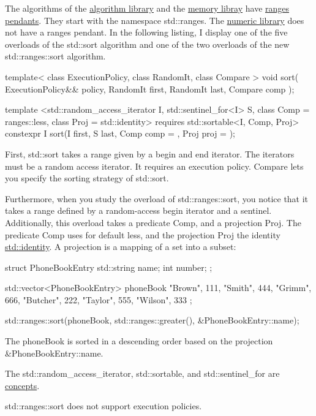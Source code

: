 The algorithms of the \href{https://en.cppreference.com/w/cpp/header/algorithm}{algorithm library} and the \href{https://en.cppreference.com/w/cpp/header/memory}{memory libray} have \href{https://en.cppreference.com/w/cpp/algorithm/ranges}{ranges pendants}. They start with the namespace std::ranges. The \href{https://en.cppreference.com/w/cpp/header/numeric}{numeric library} does not have a ranges pendant. In the following listing, I display one of the five overloads of the std::sort algorithm and one of the two overloads of the new std::ranges::sort algorithm.

\begin{cpp}
template< class ExecutionPolicy, class RandomIt, class Compare >
void sort( ExecutionPolicy&& policy,
		   RandomIt first, RandomIt last, Compare comp );

template <std::random_access_iterator I, std::sentinel_for<I> S,
		class Comp = ranges::less, class Proj = std::identity>
requires std::sortable<I, Comp, Proj>
constexpr I sort(I first, S last, Comp comp = {}, Proj proj = {});
\end{cpp}

First, std::sort takes a range given by a begin and end iterator. The iterators must be a random access iterator. It requires an execution policy. Compare lets you specify the sorting strategy of std::sort.

Furthermore, when you study the overload of std::ranges::sort, you notice that it takes a range defined by a random-access begin iterator and a sentinel. Additionally, this overload takes a predicate Comp, and a projection Proj. The predicate Comp uses for default less, and the projection Proj the identity \href{https://en.cppreference.com/w/cpp/utility/functional/identity}{std::identity}. A projection is a mapping of a set into a subset:

\begin{cpp}
struct PhoneBookEntry{
	std::string name;
	int number;
};

std::vector<PhoneBookEntry> phoneBook{ {"Brown", 111}, {"Smith", 444}, {"Grimm", 666},
							{"Butcher", 222}, {"Taylor", 555}, {"Wilson", 333} };
							
std::ranges::sort(phoneBook, std::ranges::greater(), &PhoneBookEntry::name);
\end{cpp}

The phoneBook is sorted in a descending order based on the projection \&PhoneBookEntry::name.

The std::random\_access\_iterator, std::sortable, and std::sentinel\_for are \href{https://www.modernescpp.com/index.php/tag/concepts}{concepts}.

std::ranges::sort does not support execution policies.



































